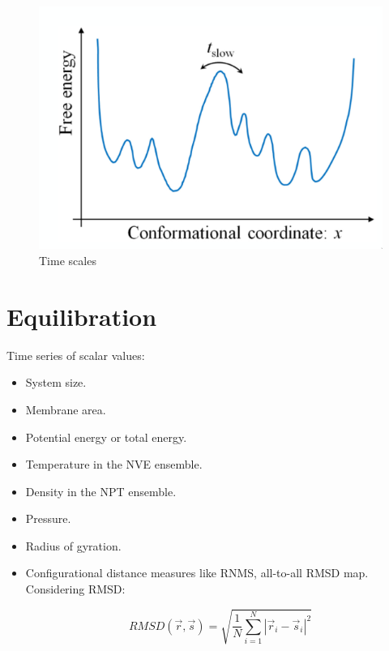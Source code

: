 	\begin{figure}[H]
		\includegraphics[width = \textwidth]{time-scales}
		\caption{Time scales}
		\label{fig:time-scales}
	\end{figure}

\section{Equilibration}
Time series of scalar values:

\begin{multicols}{2}
	\begin{itemize}
		\item System size.
		\item Membrane area.
		\item Potential energy or total energy.
		\item Temperature in the NVE ensemble.
		\item Density in the NPT ensemble.
		\item Pressure.
		\item Radius of gyration.
		\item Configurational distance measures like RNMS, all-to-all RMSD map.
			Considering RMSD:

			$$RMSD(\vec{r}, \vec{s}) = \sqrt{\frac{1}{N}\sum\limits_{i=1}^N|\vec{r}_i-\vec{s}_i|^2}$$
	\end{itemize}
\end{multicols}

